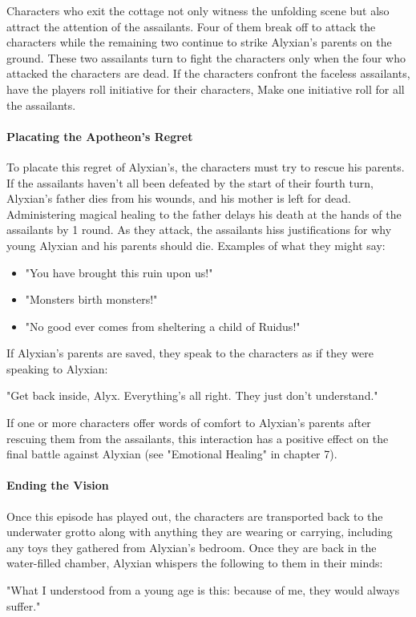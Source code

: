 \documentclass[10pt,a4,twoside,twocolumn,openany,nodeprecatedcode]{dndbook}
\begin{document}
Characters who exit the cottage not only witness the unfolding scene but also attract the attention of the assailants. Four of them break off to attack the characters while the remaining two continue to strike Alyxian's parents on the ground. These two assailants turn to fight the characters only when the four who attacked the characters are dead.
If the characters confront the faceless assailants, have the players roll initiative for their characters, Make one initiative roll for all the assailants.
\paragraph{Placating the Apotheon's Regret}
To placate this regret of Alyxian's, the characters must try to rescue his parents. If the assailants haven't all been defeated by the start of their fourth turn, Alyxian's father dies from his wounds, and his mother is left for dead. Administering magical healing to the father delays his death at the hands of the assailants by 1 round.
As they attack, the assailants hiss justifications for why young Alyxian and his parents should die. Examples of what they might say:
\begin{itemize}

\item "You have brought this ruin upon us!"
\item "Monsters birth monsters!"
\item "No good ever comes from sheltering a child of Ruidus!"
\end{itemize}


If Alyxian's parents are saved, they speak to the characters as if they were speaking to Alyxian:
\begin{DndReadAloud}{}
"Get back inside, Alyx. Everything's all right. They just don't understand."
\end{DndReadAloud}

If one or more characters offer words of comfort to Alyxian's parents after rescuing them from the assailants, this interaction has a positive effect on the final battle against Alyxian (see "Emotional Healing" in chapter 7).
\paragraph{Ending the Vision}
Once this episode has played out, the characters are transported back to the underwater grotto along with anything they are wearing or carrying, including any toys they gathered from Alyxian's bedroom. Once they are back in the water-filled chamber, Alyxian whispers the following to them in their minds:
\begin{DndReadAloud}{}
"What I understood from a young age is this: because of me, they would always suffer."
\end{DndReadAloud}
\end{document}

